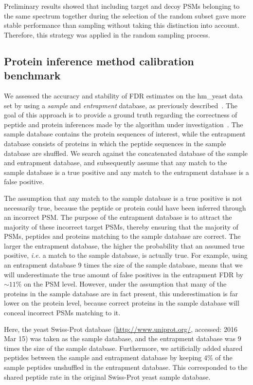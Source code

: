 \documentclass{article}
\begin{document}
Preliminary results showed that including target and decoy PSMs 
belonging to the same spectrum together during the selection of the 
random subset gave more stable performance than sampling without 
taking this distinction into account. Therefore, this strategy was 
applied in the random sampling process.

\subsection*{Protein inference method calibration benchmark}

We assessed the accuracy and stability of FDR estimates on the 
hm\_yeast data set by using a {\em sample} and {\em entrapment} 
database, as previously described~\cite{granholm2013determining}. The 
goal of this approach is to provide a ground truth regarding the 
correctness of peptide and protein inferences made by the algorithm 
under investigation~\cite{the:how}. The sample database contains the 
protein sequences of interest, while the entrapment database consists 
of proteins in which the peptide sequences in the sample database are 
shuffled. We search against the concatenated database of the sample 
and entrapment database, and subsequently assume that any match to the 
sample database is a true positive and any match to the entrapment 
database is a false positive. 

The assumption that any match to the sample database is a true positive 
is not necessarily true, because the peptide or protein could have been 
inferred through an incorrect PSM. The purpose of the entrapment 
database is to attract the majority of these incorrect target PSMs, 
thereby ensuring that the majority of PSMs, peptides and proteins 
matching to the sample database are correct. The larger the entrapment 
database, the higher the probability that an assumed true positive, 
{\em i.e.} a match to the sample database, is actually true. For 
example, using an entrapment database 9 times the size of the sample 
database, means that we will underestimate the true amount of false 
positives in the entrapment FDR by ${\sim}11\%$ on the PSM level. 
However, under the assumption that many of the proteins in the sample 
database are in fact present, this underestimation is far lower on the 
protein level, because correct proteins in the sample database will 
conceal incorrect PSMs matching to it.

Here, the yeast Swiss-Prot database (\url{http://www.uniprot.org/}, 
accessed: 2016 Mar 15) was taken as the sample database, and the 
entrapment database was $9$ times the size of the sample database. 
Furthermore, we artificially added shared peptides between the sample 
and entrapment database by keeping $4\%$ of the sample peptides 
unshuffled in the entrapment database. This corresponded to the 
shared peptide rate in the original Swiss-Prot yeast sample database.
\end{document}
